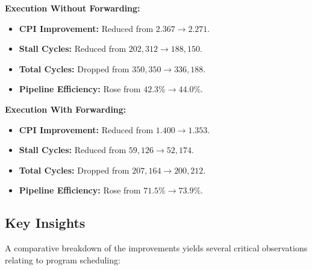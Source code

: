 \documentclass[11pt]{report}
\begin{document}
\textbf{Execution Without Forwarding:}
\begin{itemize}
    \item \textbf{CPI Improvement:} Reduced from $2.367 \rightarrow 2.271$.
    \item \textbf{Stall Cycles:} Reduced from $202,312 \rightarrow 188,150$.
    \item \textbf{Total Cycles:} Dropped from $350,350 \rightarrow 336,188$.
    \item \textbf{Pipeline Efficiency:} Rose from $42.3\% \rightarrow 44.0\%$.
\end{itemize}

\textbf{Execution With Forwarding:}
\begin{itemize}
    \item \textbf{CPI Improvement:} Reduced from $1.400 \rightarrow 1.353$.
    \item \textbf{Stall Cycles:} Reduced from $59,126 \rightarrow 52,174$.
    \item \textbf{Total Cycles:} Dropped from $207,164 \rightarrow 200,212$.
    \item \textbf{Pipeline Efficiency:} Rose from $71.5\% \rightarrow 73.9\%$.
\end{itemize}

\subsection{Key Insights}

A comparative breakdown of the improvements yields several critical observations relating to program scheduling:
\end{document}
